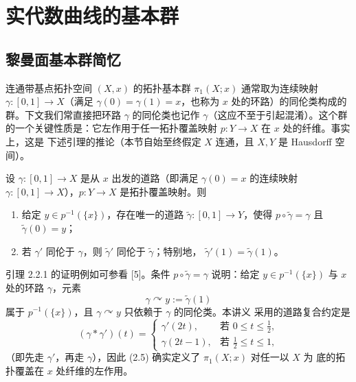 \section{实代数曲线的基本群}
\label{sec:02.2}

\subsection{黎曼面基本群简忆}
\label{sec:02.2.1}

连通带基点拓扑空间 $(X,x)$ 的拓扑基本群 $\pi_1(X;x)$ 通常取为连续映射
$\gamma:[0,1]\to X$（满足 $\gamma(0)=\gamma(1)=x$，也称为 $x$ 处的环路）的同伦类构成的
群。下文我们常直接把环路 $\gamma$ 的同伦类也记作 $\gamma$（这应不至于引起混淆）。这个群
的一个关键性质是：它左作用于任一拓扑覆盖映射 $p:Y\to X$ 在 $x$ 处的纤维。事实上，这是
下述引理的推论（本节自始至终假定 $X$ 连通，且 $X,Y$ 是 Hausdorff 空间）。

\begin{lemma}[道路与同伦的提升]\label{lem:2.2.1}
设 $\gamma:[0,1]\to X$ 是从 $x$ 出发的道路（即满足 $\gamma(0)=x$ 的连续映射
$\gamma:[0,1]\to X$），$p:Y\to X$ 是拓扑覆盖映射。则
\begin{enumerate}[label=(\roman*), leftmargin=2.2em, itemsep=0.15em]
\item 给定 $y\in p^{-1}(\{x\})$，存在唯一的道路 $\tilde\gamma:[0,1]\to Y$，使得
      $p\circ\tilde\gamma=\gamma$ 且 $\tilde\gamma(0)=y$；
\item 若 $\gamma'$ 同伦于 $\gamma$，则 $\tilde\gamma'$ 同伦于 $\tilde\gamma$；特别地，
      $\tilde\gamma'(1)=\tilde\gamma(1)$。
\end{enumerate}
\end{lemma}

引理 2.2.1 的证明例如可参看 [5]。条件 $p\circ\tilde\gamma=\gamma$ 说明：给定
$y\in p^{-1}(\{x\})$ 与 $x$ 处的环路 $\gamma$，元素
\begin{equation}\label{eq:2.5}
\gamma\curvearrowright y:=\tilde\gamma(1)
\end{equation}
属于 $p^{-1}(\{x\})$，且 $\gamma\curvearrowright y$ 只依赖于 $\gamma$ 的同伦类。本讲义
采用的道路复合约定是
\begin{equation}\label{eq:2.6}
(\gamma*\gamma')(t)=
\begin{cases}
\gamma'(2t), & \text{若 } 0\le t\le\tfrac12,\\[0.3em]
\gamma(2t-1), & \text{若 } \tfrac12\le t\le1,
\end{cases}
\end{equation}
（即先走 $\gamma'$，再走 $\gamma$），因此 (2.5) 确实定义了 $\pi_1(X;x)$ 对任一以 $X$ 为
底的拓扑覆盖在 $x$ 处纤维的左作用。


